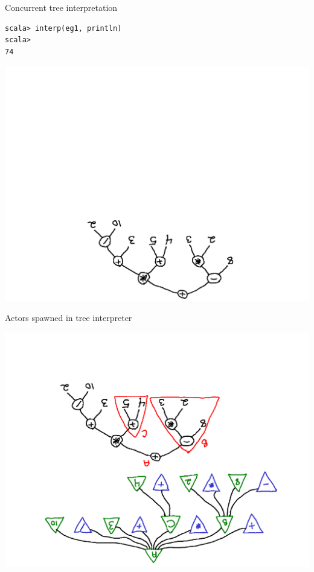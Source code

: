 \documentclass[14pt,t,usepdftitle=false,
xcolornames=x11names,svgnames,dvipsnames]{beamer}
\begin{document}
\begin{frame}[fragile]{Concurrent tree interpretation}
  \begin{lstlisting}[style=scalarepl]
scala> interp(eg1, println)
scala>
74
  \end{lstlisting}
  \vspace{-12mm}
  \begin{center}
    \includegraphics[scale=.5,angle=180]{expr-tree.pdf}
  \end{center}
\end{frame}

\begin{frame}[fragile]{Actors spawned in tree interpreter}
  \vspace{-12mm}
  \begin{center}
    \includegraphics[scale=.4,angle=180]{interp-partition-spawn.pdf}
  \end{center}
\end{frame}
\end{document}
